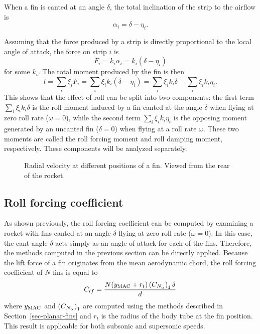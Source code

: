When a fin is canted at an angle $\delta$, the total
inclination of the strip to the airflow is
%
\begin{equation}
\alpha_i = \delta - \eta_i.
\label{eq-roll-aoa-variation}
\end{equation}

Assuming that the force produced by a strip is directly proportional
to the local angle of attack, the force on strip $i$ is
%
\begin{equation}
F_i = k_i \alpha_i = k_i (\delta - \eta_i)
\end{equation}
%
for some $k_i$.  The total moment produced by the fin is then
%
\begin{equation}
l = \sum_i \xi_i F_i = \sum_i \xi_i k_i (\delta - \eta_i)
  = \sum_i \xi_i k_i \delta - \sum_i \xi_i k_i \eta_i.
\end{equation}
%
This shows that the effect of roll can be split into two components:
the first term $\sum_i \xi_i k_i \delta$ is the roll moment induced by
a fin canted at the angle $\delta$ when flying at zero roll rate
($\omega=0$), while the second term $\sum_i \xi_i k_i \eta_i$ is the
opposing moment generated by an uncanted fin ($\delta=0$) when flying
at a roll rate $\omega$.  These two moments are called the roll
forcing moment and roll damping moment, respectively.  These
components will be analyzed separately.


\begin{figure}
\centering
{}
\caption{Radial velocity at different positions of a fin.  Viewed from
  the rear of the rocket.}
\label{fig-roll-velocity}
\end{figure}



\subsection{Roll forcing coefficient}

As shown previously, the roll forcing coefficient can be computed by
examining a rocket with fins canted at an angle $\delta$ flying at
zero roll rate ($\omega=0$).  In this case, the cant angle $\delta$ acts
simply as an angle of attack for each of the fins.  Therefore, the
methods computed in the previous section can be directly applied.
Because the lift force of a fin originates from the mean aerodynamic
chord, the roll forcing coefficient of $N$ fins is equal to
%
\begin{equation}
C_{lf} = \frac{N (y_{\rm MAC}+r_t) \del{\CNa}_1 \delta}{d}
\label{eq-roll-forcing-moment}
\end{equation}
%
where $y_{\rm MAC}$ and $\del{\CNa}_1$ are computed using the methods
described in Section~\ref{sec-planar-fins} and $r_t$ is the radius of
the body tube at the fin position.  This result is applicable
for both subsonic and supersonic speeds.



